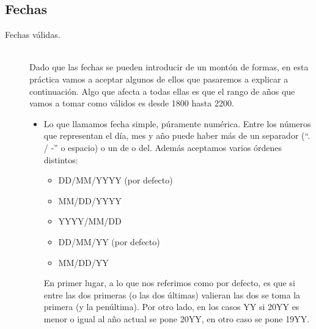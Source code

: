 \documentclass[12pt]{article}
\begin{document}
    \subsection{Fechas}
    \begin{description}
        \item [Fechas válidas.]~\\
            Dado que las fechas se pueden introducir de un montón de formas, en esta práctica vamos a aceptar algunos de ellos que pasaremos a explicar a continuación. Algo que afecta a todas ellas es que el rango de años que vamos a tomar como válidos es desde 1800 hasta 2200.
            \begin{itemize}
                \item Lo que llamamos fecha simple, púramente numérica. Entre los números que representan el día, mes y año puede haber más de un separador (``. / -'' o espacio) o un de o del. Además aceptamos varios órdenes distintos:
                    \begin{itemize}
                        \item DD/MM/YYYY (por defecto)
                        \item MM/DD/YYYY
                        \item YYYY/MM/DD
                        \item DD/MM/YY (por defecto)
                        \item MM/DD/YY
                    \end{itemize}
                    En primer lugar, a lo que nos referimos como por defecto, es que si entre las dos primeras (o las dos últimas) valieran las dos se toma la primera (y la penúltima). Por otro lado, en los casos YY si 20YY es menor o igual al año actual se pone 20YY, en otro caso se pone 19YY. 


\end{itemize}
\end{description}
\end{document}
